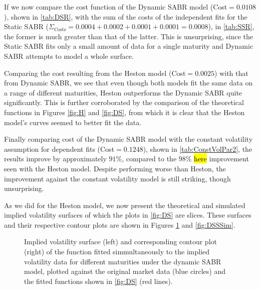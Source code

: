 If we now compare the cost function of the Dynamic SABR model (Cost$=0.0108$), shown in \autoref{tab:DSR}, with the sum of the costs of the independent fits for the Static SABR ($\Sigma_{\mathrm{Costs}}=0.0004+0.0002+0.0001+0.0001=0.0008$), in \autoref{tab:SSR}, the former is much greater than that of the latter.
This is unsurprising, since the Static SABR fits only a small amount of data for a single maturity and Dynamic SABR attempts to model a whole surface.

Comparing the cost resulting from the Heston model (Cost$=0.0025$) with that from Dynamic SABR, we see that even though both models fit the same data on a range of different maturities, Heston outperforms the Dynamic SABR quite significantly. This is further corroborated by the comparison of the theoretical functions in Figures \ref{fig:H} and \ref{fig:DS}, from which it is clear that the Heston model's curves seemed to better fit the data.

Finally comparing cost of the Dynamic SABR model with the constant volatility assumption for dependent fits (Cost$=0.1248$), shown in \autoref{tab:ConstVolPar2}, the results improve by approximately $91\%$, compared to the $98\%$ \hl{here} improvement seen with the Heston model. Despite performing worse than Heston, the improvement against the constant volatility model is still striking, though unsurprising.

As we did for the Heston model, we now present the theoretical and simulated implied volatility surfaces of which the plots in \autoref{fig:DS} are slices. 
These surfaces and their respective contour plots are shown in Figures \ref{fig:DSS} and \ref{fig:DSSSim}.



\begin{figure}[H]
  \begin{subfigmatrix}{2}
  \end{subfigmatrix}
    \caption[Implied volatility surface and corresponding contour plot of the function fitted simmultaneously to the implied volatility data for different maturities under the dynamic SABR model, plotted against the original market data and the fitted functions shown in \autoref{fig:DS}.]{Implied volatility surface (left) and corresponding contour plot (right) of the function fitted simmultaneously to the implied volatility data for different maturities under the dynamic SABR model, plotted against the original market data (blue circles) and the fitted functions shown in \autoref{fig:DS} (red lines).}\label{fig:DSS}
\end{figure}   


